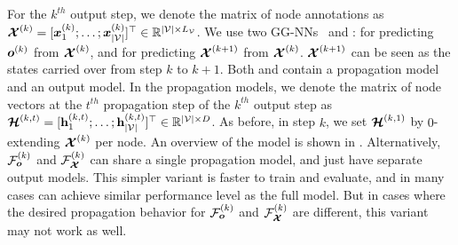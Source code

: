 \documentclass{article} %
\newcommand{\OurMethodMinorShort}{GG-NN}
\newcommand{\OurMethodMinorShorts}{\OurMethodMinorShort s}
\begin{document}
For the $k^{th}$ output step, we denote the matrix of node annotations as
$\boldsymbol{\mathcal{X}}^{(k)} = [\boldsymbol{x}_{1}^{(k)}; \ldots; \boldsymbol{x}_{|\mathcal{V}|}^{(k)}]^\top \in
\mathbb{R}^{|\mathcal{V}| \times L_{\mathcal{V}}}$.
We use two \OurMethodMinorShorts~ and :  for
predicting $\boldsymbol{o}^{(k)}$ from $\boldsymbol{\mathcal{X}}^{(k)}$, and  for
predicting $\boldsymbol{\mathcal{X}}^{(k+1)}$ from $\boldsymbol{\mathcal{X}}^{(k)}$. $\boldsymbol{\mathcal{X}}^{(k+1)}$ can be seen as the states
carried over from step $k$ to $k+1$. Both  and 
contain a propagation model and an output model. In the propagation models, we denote the matrix of node vectors at the $t^{th}$ propagation step of the
$k^{th}$ output step as
$\boldsymbol{\mathcal{H}}^{(k,t)} = [\mathbf{h}_{1}^{(k,t)}; \ldots; \mathbf{h}_{|\mathcal{V}|}^{(k,t)}]^\top \in \mathbb{R}^{|\mathcal{V}| \times D}$.
As before, in step $k$, we set $\boldsymbol{\mathcal{H}}^{(k,1)}$ by $0$-extending $\boldsymbol{\mathcal{X}}^{(k)}$ per node.
An overview of the model is shown in .
Alternatively, $\mathcal{F}_{\boldsymbol{o}}^{(k)}$ and $\mathcal{F}_{\boldsymbol{\boldsymbol{\mathcal{X}}}}^{(k)}$ can share a single propagation
model, and just have separate output models. This simpler variant is faster to
train and evaluate, and in many cases can achieve similar performance level as
the full model.  But in cases where the desired propagation behavior for
$\mathcal{F}_{\boldsymbol{o}}^{(k)}$ and $\mathcal{F}_{\boldsymbol{\boldsymbol{\mathcal{X}}}}^{(k)}$ are different, this variant may not work as
well.


\end{document}
